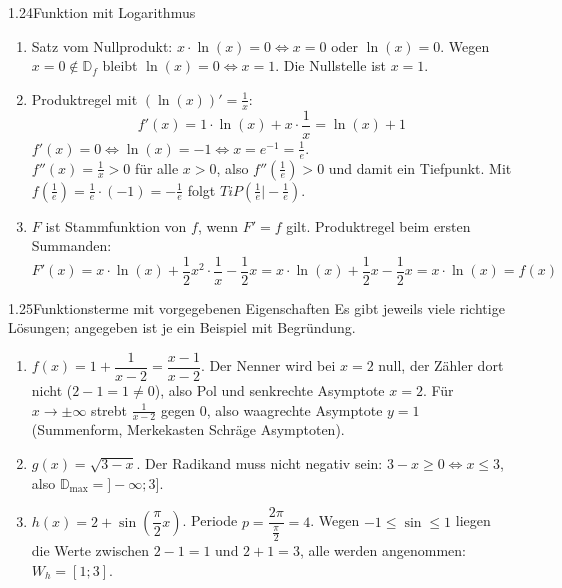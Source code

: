 \begin{loesung}{1.24}{Funktion mit Logarithmus}
\begin{enumerate}[label=\alph*)]
  \item Satz vom Nullprodukt: $x\cdot\ln{(x)} = 0 \Longleftrightarrow x=0$ oder $\ln{(x)}=0$. Wegen $x=0\notin\mathds{D}_f$ bleibt $\ln{(x)}=0\Longleftrightarrow x=1$. Die Nullstelle ist $x=1$.
  \item Produktregel mit $(\ln{(x)})' = \frac{1}{x}$:
  \[f'(x) = 1\cdot\ln{(x)}+x\cdot\dfrac{1}{x} = \ln{(x)}+1\]
  $f'(x)=0\Longleftrightarrow\ln{(x)}=-1\Longleftrightarrow x=e^{-1}=\frac{1}{e}$.\\
  $f''(x) = \frac{1}{x}>0$ für alle $x>0$, also $f''(\frac{1}{e})>0$ und damit ein Tiefpunkt. Mit $f(\frac{1}{e}) = \frac{1}{e}\cdot(-1) = -\frac{1}{e}$ folgt $TiP\left(\frac{1}{e}\big|-\frac{1}{e}\right)$.
  \item $F$ ist Stammfunktion von $f$, wenn $F'=f$ gilt. Produktregel beim ersten Summanden:
  \[F'(x) = x\cdot\ln{(x)}+\dfrac{1}{2}x^2\cdot\dfrac{1}{x}-\dfrac{1}{2}x = x\cdot\ln{(x)}+\dfrac{1}{2}x-\dfrac{1}{2}x = x\cdot\ln{(x)} = f(x)\]
\end{enumerate}
\end{loesung}

\begin{loesung}{1.25}{Funktionsterme mit vorgegebenen Eigenschaften}
Es gibt jeweils viele richtige Lösungen; angegeben ist je ein Beispiel mit Begründung.
\begin{enumerate}[label=\alph*)]
  \item $f(x) = 1+\dfrac{1}{x-2} = \dfrac{x-1}{x-2}$. Der Nenner wird bei $x=2$ null, der Zähler dort nicht ($2-1=1\neq 0$), also Pol und senkrechte Asymptote $x=2$. Für $x\longrightarrow\pm\infty$ strebt $\frac{1}{x-2}$ gegen $0$, also waagrechte Asymptote $y=1$ (Summenform, Merkekasten \glqq Schräge Asymptoten\grqq).
  \item $g(x) = \sqrt{3-x}$. Der Radikand muss nicht negativ sein: $3-x\geq 0\Longleftrightarrow x\leq 3$, also $\mathds{D}_{\text{max}} = ]-\infty;3]$.
  \item $h(x) = 2+\sin{\left(\dfrac{\pi}{2}x\right)}$. Periode $p = \dfrac{2\pi}{\frac{\pi}{2}} = 4$. Wegen $-1\leq\sin\leq 1$ liegen die Werte zwischen $2-1=1$ und $2+1=3$, alle werden angenommen: $W_h = [1;3]$.
\end{enumerate}
\end{loesung}

